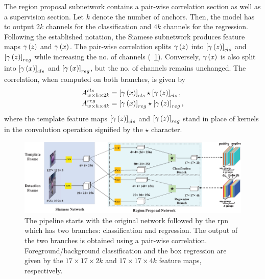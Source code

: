 The region proposal subnetwork contains a pair-wise correlation section as well as a supervision section. Let $k$ denote the number of anchors. Then, the model has to output $2k$ channels for the classification and $4k$ channels for the regression. Following the established notation, the Siamese subnetwork produces feature maps ${\gamma} \left( z \right)$ and ${\gamma} \left( x \right)$. The pair-wise correlation splits ${\gamma} \left( z \right)$ into $\left[ {{\gamma} \left( z \right)} \right]_{cls}$ and $\left[ {{\gamma} \left( z \right)} \right]_{reg}$ while increasing the no. of channels (\figstr{}~\ref{fig:SiamRPNNetArchitecture}). Conversely, ${\gamma} \left( x \right)$ is also split into $\left[ {{\gamma} \left( x \right)} \right]_{cls}$ and $\left[ {{\gamma} \left( x \right)} \right]_{reg}$, but the no. of channels remains unchanged. The correlation, when computed on both branches, is given by
\begin{equation}
    \begin{aligned}
        {A}_{w \times h \times 2k}^{cls} & =
        \left[ {{\gamma} \left( x \right)} \right]_{cls} \star \left[ {{\gamma} \left( z \right)} \right]_{cls}, \\
        {A}_{w \times h \times 4k}^{reg} & =
        \left[ {{\gamma} \left( x \right)} \right]_{reg} \star \left[ {{\gamma} \left( z \right)} \right]_{reg},
    \end{aligned}
\end{equation}
where the template feature maps $\left[ {{\gamma} \left( z \right)} \right]_{cls}$ and $\left[ {{\gamma} \left( z \right)} \right]_{reg}$ stand in place of kernels in the convolution operation signified by the $\star$ character.

\begin{figure}[t]
    \centerline{\includegraphics[width=\linewidth]{figures/theoretical_foundations/siam_rpn_architecture.pdf}}
    \caption[\siamrpn{} architecture]{The pipeline starts with the original \siamfc{} network followed by the \gls{rpn} which has two branches: classification and regression. The output of the two branches is obtained using a pair-wise correlation. Foreground/background classification and the box regression are given by the $17 \times 17 \times 2k$ and $17 \times 17 \times 4k$ feature maps, respectively. }
    \label{fig:SiamRPNNetArchitecture}
\end{figure}

